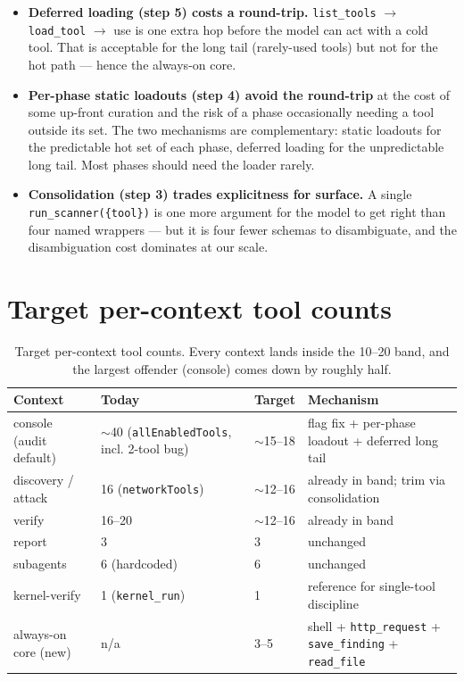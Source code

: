 \documentclass[11pt]{article}
\begin{document}
\begin{itemize}[leftmargin=*]
  \item \textbf{Deferred loading (step 5) costs a round-trip.}
  \texttt{list\_tools} $\rightarrow$ \texttt{load\_tool} $\rightarrow$ use is one
  extra hop before the model can act with a cold tool. That is acceptable for the
  long tail (rarely-used tools) but not for the hot path --- hence the always-on
  core.
  \item \textbf{Per-phase static loadouts (step 4) avoid the round-trip} at the
  cost of some up-front curation and the risk of a phase occasionally needing a
  tool outside its set. The two mechanisms are complementary: static loadouts for
  the predictable hot set of each phase, deferred loading for the unpredictable
  long tail. Most phases should need the loader rarely.
  \item \textbf{Consolidation (step 3) trades explicitness for surface.} A single
  \texttt{run\_scanner(\{tool\})} is one more argument for the model to get right
  than four named wrappers --- but it is four fewer schemas to disambiguate, and
  the disambiguation cost dominates at our scale.
\end{itemize}

\section{Target per-context tool counts}

\begin{table}[ht]
\centering
\small
\begin{tabular}{llll}
\toprule
Context & Today & Target & Mechanism \\
\midrule
console (audit default) & $\sim$40 (\texttt{allEnabledTools}, incl. 2-tool bug) & $\sim$15--18 & flag fix + per-phase loadout + deferred long tail \\
discovery / attack & 16 (\texttt{networkTools}) & $\sim$12--16 & already in band; trim via consolidation \\
verify & 16--20 & $\sim$12--16 & already in band \\
report & 3 & 3 & unchanged \\
subagents & 6 (hardcoded) & 6 & unchanged \\
kernel-verify & 1 (\texttt{kernel\_run}) & 1 & reference for single-tool discipline \\
always-on core (new) & n/a & 3--5 & shell + \texttt{http\_request} + \texttt{save\_finding} + \texttt{read\_file} \\
\bottomrule
\end{tabular}
\caption{Target per-context tool counts. Every context lands inside the 10--20 band, and the largest offender (console) comes down by roughly half.}
\label{tab:targets}
\end{table}
\end{document}
